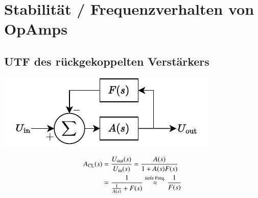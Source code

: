 \section{Stabilität / Frequenzverhalten von OpAmps}

\subsection{UTF des rückgekoppelten Verstärkers}

\begin{minipage}[c]{0.48\columnwidth}
    \includegraphics[width=\columnwidth, align=t]{images/10_stabilitaet_loop.pdf}
\end{minipage}
\hfill
\begin{minipage}[c]{0.48\columnwidth}
    \vspace{-0.2cm}
    \begin{align*}
         A_{\rm CL}(s)  &= \frac{U_{\rm out}(s)}{U_{\rm in}(s)} = \frac{A(s)}{1+ A(s) F(s)} \\
                        &= \frac{1}{\frac{1}{A(s)} + F(s)} \overset{\text{tiefe Freq.}}{\approx} \frac{1}{F(s)}
    \end{align*}
\end{minipage}







